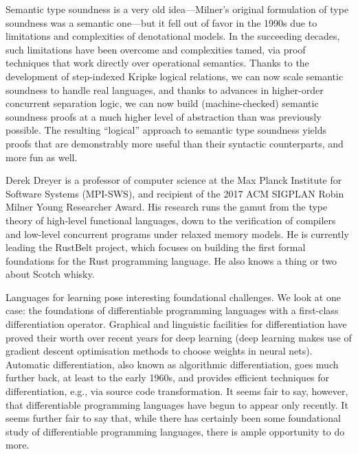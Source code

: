Semantic type soundness is a very old idea—Milner’s original formulation of type
soundness was a semantic one—but it fell out of favor in the 1990s due to
limitations and complexities of denotational models. In the succeeding decades,
such limitations have been overcome and complexities tamed, via proof techniques
that work directly over operational semantics. Thanks to the development of
step-indexed Kripke logical relations, we can now scale semantic soundness to
handle real languages, and thanks to advances in higher-order concurrent
separation logic, we can now build (machine-checked) semantic soundness proofs
at a much higher level of abstraction than was previously possible. The
resulting ``logical'' approach to semantic type soundness yields proofs that are
demonstrably more useful than their syntactic counterparts, and more fun as
well.

\bio
Derek Dreyer is a professor of computer science at the Max Planck Institute for
Software Systems (MPI-SWS), and recipient of the 2017 ACM SIGPLAN Robin Milner
Young Researcher Award.  His research runs the gamut from the type theory of
high-level functional languages, down to the verification of compilers and
low-level concurrent programs under relaxed memory models.  He is currently
leading the RustBelt project, which focuses on building the first formal
foundations for the Rust programming language.  He also knows a thing or two
about Scotch whisky.

\newpage



\talkabstract
Languages for learning pose interesting foundational challenges. We
look at one case: the foundations of differentiable programming
languages with a first-class differentiation operator.  Graphical
and linguistic facilities for differentiation have proved their
worth over recent years for deep learning (deep learning makes
use of gradient descent optimisation methods to choose weights in
neural nets). Automatic differentiation, also known as algorithmic
differentiation, goes much further back, at least to the early
1960s, and provides efficient techniques for differentiation, e.g.,
via source code transformation. It seems fair to say, however, that
differentiable programming languages have begun to appear only
recently. It seems further fair to say that, while there has certainly
been some foundational study of differentiable programming languages,
there is ample opportunity to do more.

